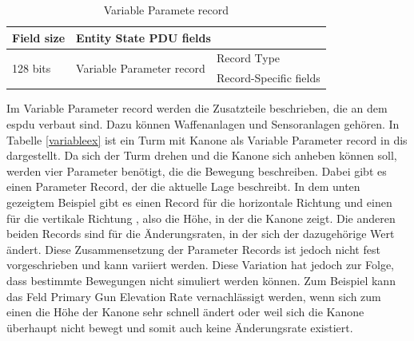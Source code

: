 \begin{table}[H]
	\centering
	\begin{tabular}{|l|l|l|}
		\hline
		Field size                & \multicolumn{2}{l|}{Entity State PDU fields}                        \\ \hline
		\multirow{2}{*}{128 bits} & \multirow{2}{*}{Variable Parameter record} & Record Type            \\ \cline{3-3} 
		&                                            & Record-Specific fields \\ \hline
	\end{tabular}
\caption[Variable Parameter record ]{Variable Paramete record\cite{SISOStandardsActivityCommitteeoftheIEEEComputerSociety.}}
\label{variable}
\end{table}
Im Variable Parameter record werden die Zusatzteile beschrieben, die an dem \ac{espdu} verbaut sind. Dazu können Waffenanlagen und Sensoranlagen gehören. In Tabelle \ref{variableex} ist ein Turm mit Kanone als  Variable Parameter record in \ac{dis} dargestellt. Da sich der Turm drehen und die Kanone sich anheben können soll, werden vier Parameter benötigt, die die Bewegung beschreiben. Dabei gibt es einen Parameter Record, der die aktuelle Lage beschreibt. In dem unten gezeigtem Beispiel gibt es einen  Record für die horizontale Richtung und einen für die vertikale Richtung , also die Höhe, in der die Kanone zeigt. Die anderen beiden Records sind für die Änderungsraten, in der sich der dazugehörige Wert ändert. Diese Zusammensetzung der Parameter Records ist jedoch nicht fest vorgeschrieben und kann variiert werden. Diese Variation hat jedoch zur Folge, dass bestimmte Bewegungen nicht simuliert werden können. Zum Beispiel kann das Feld \glqq Primary Gun Elevation Rate\grqq{}  vernachlässigt werden, wenn sich zum einen die Höhe der Kanone sehr schnell ändert oder weil sich die Kanone überhaupt nicht bewegt und somit auch keine Änderungsrate existiert.  
\cite{SISOStandardsActivityCommitteeoftheIEEEComputerSociety.}
\cite{Shanks.}  

